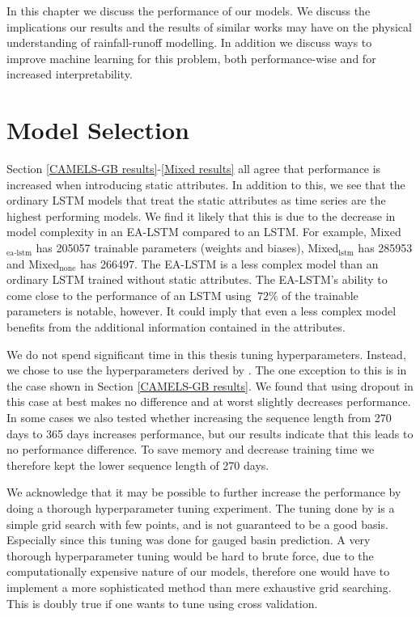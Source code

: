 In this chapter we discuss the performance of our models. We discuss the implications 
our results and the results of similar works may have on the physical understanding 
of rainfall-runoff modelling. In addition we discuss ways to improve machine 
learning for this problem, both performance-wise and for increased interpretability.
\section{Model Selection}
\label{discuss model selection}
Section \ref{CAMELS-GB results}-\ref{Mixed results} 
all agree that performance is increased when introducing static attributes. In 
addition to this, we see that the ordinary LSTM models that treat the static 
attributes as time series are the highest performing models. We find it likely that 
this is due  to the decrease in model complexity in an EA-LSTM compared to an LSTM. 
For example, Mixed$_\text{ea-lstm}$ has 205057 trainable parameters (weights and 
biases), Mixed$_\text{lstm}$ has 285953 and Mixed$_\text{none}$ has 266497. The 
EA-LSTM is a less complex model than an ordinary LSTM trained without 
static attributes. The EA-LSTM's ability to come close to the performance of an 
LSTM using $~72\%$ of the trainable parameters is notable, however. It could imply 
that even a less complex model benefits from the additional information 
contained in the attributes. 

We do not spend significant time in this thesis tuning hyperparameters. Instead, 
we chose to use the hyperparameters derived by \citet{lstm_second_paper}. The one 
exception to this is in the case shown in Section \ref{CAMELS-GB results}. We found 
that using dropout in this case at best makes no difference and at worst slightly 
decreases performance. In some cases we also tested whether increasing the 
sequence length from 270 days to 365 days increases performance, but our results 
indicate that this leads to no performance difference. To save memory and decrease 
training time we therefore kept the lower sequence length of 270 days.

We acknowledge that it may be possible to further increase the performance by doing 
a thorough hyperparameter tuning experiment. The tuning done by \citet{lstm_second_paper} 
is a simple grid search with few points, and is not guaranteed to be a good basis. 
Especially since this tuning was done for gauged basin prediction. A very thorough 
hyperparameter tuning would be hard to brute force, due to the computationally 
expensive nature of our models, therefore one would have to implement a more sophisticated 
method than mere exhaustive grid searching. This is doubly true if one wants to tune 
using cross validation.

